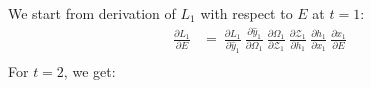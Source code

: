 \documentclass{article}
\begin{document}
We start from derivation of $L_1$ with respect to $E$ at $t=1$:
\begin{align*}
\frac{\partial L_1}{ \partial{E}} & = ~\frac{\partial L_1}{ \partial \hat{y}_1}~\frac{\partial \hat{y}_1}{ \partial \Omega_1}~\frac{\partial \Omega_1}{\partial \mathcal{Z}_1}~\frac{\partial \mathcal{Z}_1}{ \partial h_1} ~\frac{\partial h_1}{ \partial x_1}~\frac{\partial x_1}{ \partial E} \\
\end{align*}
For $t=2$, we get:
\end{document}
